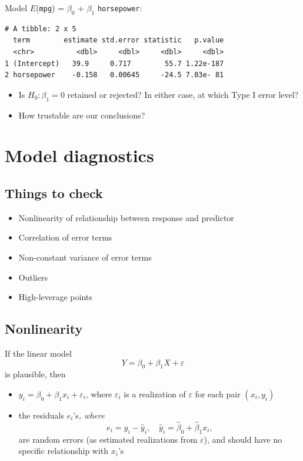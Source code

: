 \documentclass[]{article}
\providecommand{\tightlist}{%
  \setlength{\itemsep}{0pt}\setlength{\parskip}{0pt}}
\begin{document}
Model \(E\)(\texttt{mpg}) = \(\beta_0\) + \(\beta_1\)
\texttt{horsepower}:

\begin{verbatim}
# A tibble: 2 x 5
  term        estimate std.error statistic   p.value
  <chr>          <dbl>     <dbl>     <dbl>     <dbl>
1 (Intercept)   39.9     0.717        55.7 1.22e-187
2 horsepower    -0.158   0.00645     -24.5 7.03e- 81
\end{verbatim}

\begin{itemize}
\tightlist
\item
  Is \(H_0: \beta_1=0\) retained or rejected? In either case, at which
  Type I error level?
\item
  How trustable are our conclusions?
\end{itemize}

\section{Model diagnostics}\label{model-diagnostics}

\subsection{Things to check}\label{things-to-check}

\begin{itemize}
\tightlist
\item
  Nonlinearity of relationship between response and predictor
\item
  Correlation of error terms
\item
  Non-constant variance of error terms
\item
  Outliers
\item
  High-leverage points
\end{itemize}

\subsection{Nonlinearity}\label{nonlinearity}

If the linear model \[Y=\beta_0 + \beta_1 X + \varepsilon\] is
plausible, then

\begin{itemize}
\tightlist
\item
  \(y_i = \beta_0 + \beta_1 x_i + \varepsilon_i\), where
  \(\varepsilon_i\) is a realization of \(\varepsilon\) for each pair
  \((x_i,y_i)\)
\item
  the residuals \(e_i\)'s\emph{, where
  \[e_i = y_i - \hat{y}_i, \quad \hat{y}_i=\hat{\beta}_0 + \hat{\beta}_1 x_i,\]
  }are random errors (as estimated realizations from \(\varepsilon\)),
  and should have no specific relationship with \(x_i\)'s
\end{itemize}
\end{document}
